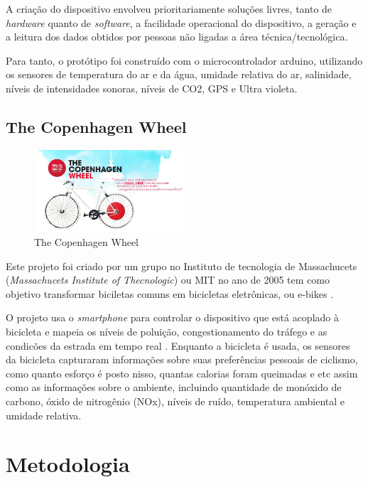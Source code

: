\documentclass[final,12pt, times, 5p, twocolumn]{elsarticle}
\begin{document}
A criação do dispositivo envolveu prioritariamente soluções livres, tanto de \textit{hardware} quanto de \textit{software}, a facilidade operacional do dispositivo, a geração e a leitura dos dados obtidos por pessoas não ligadas a área técnica/tecnológica.

Para tanto, o protótipo foi construído com o microcontrolador arduino, utilizando os sensores de temperatura do ar e da água, umidade relativa do ar, salinidade, níveis de intensidades sonoras, níveis de CO2, GPS e Ultra violeta.

\subsection{The Copenhagen Wheel}

\begin{figure}[ht!]
\centering
\includegraphics[width=0.5\textwidth]{tcw.jpg}
\caption{\label{fig:tcw.jpg}The Copenhagen Wheel}
\end{figure}

Este projeto foi criado por um grupo no Instituto de tecnologia de Massachucets (\textit{Massachucets Institute of Thecnologic}) ou MIT no ano de 2005 tem como objetivo transformar biciletas comuns em bicicletas eletrônicas, ou e-bikes \cite{e-bikes}.

O projeto usa o \textit{smartphone} para controlar o dispositivo que está acoplado à bicicleta e mapeia os níveis de poluição, congestionamento do tráfego e as condicões da estrada em tempo real \cite{artigotcw}. 
Enquanto a bicicleta é usada, os sensores da bicicleta capturaram informações sobre suas preferências pessoais de ciclismo, como quanto esforço é posto nisso, quantas calorias foram queimadas e etc assim como as informações sobre o ambiente, incluindo quantidade de monóxido de carbono, óxido de nitrogênio (NOx), níveis de ruído, temperatura ambiental e umidade relativa.

\section{Metodologia}
\end{document}
